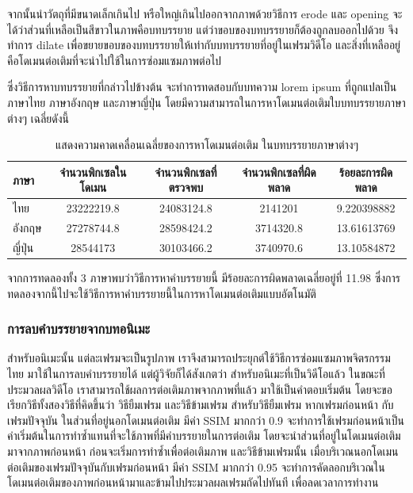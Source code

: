 \documentclass[hidelinks, a4paper,12pt]{article}
\numberwithin{equation}{section}							%
\numberwithin{equation}{section}
\begin{document}
{	\hspace{1cm} จากนั้นนำวัตถุที่มีขนาดเล็กเกินไป หรือใหญ่เกินไปออกจากภาพด้วยวิธีการ erode และ opening
	จะได้ว่าส่วนที่เหลือเป็นสีขาวในภาพคือบทบรรยาย แต่ว่าขอบของบทบรรยายก็ต้องถูกลบออกไปด้วย จึงทำการ dilate เพื่อขยายขอบของบทบรรยายให้เท่ากับบทบรรยายที่อยู่ในเฟรมวิดีโอ และสิ่งที่เหลืออยู่คือโดเมนต่อเติมที่จะนำไปใช้ในการซ่อมแซมภาพต่อไป
	
	\hspace{1cm} ซึ่งวิธีการหาบทบรรยายที่กล่าวไปข้างต้น จะทำการทดสอบกับบทความ lorem ipsum ที่ถูกแปลเป็นภาษาไทย ภาษาอังกฤษ และภาษาญี่ปุ่น โดยมีความสามารถในการหาโดเมนต่อเติมใบบทบรรยายภาษาต่างๆ  เฉลี่ยดังนี้
	
	\begin{table}[H]
		\centering
		\begin{tabular}[ht]{|l|c|c|c|c|}
			\hline
			ภาษา  & จำนวนพิกเซลในโดเมน & จำนวนพิกเซลที่ตรวจพบ & จำนวนพิกเซลที่ผิดพลาด & ร้อยละการผิดพลาด \\
			\hline
			ไทย & 23222219.8 & 24083124.8 & 2141201 & 9.220398882 \\
			อังกฤษ & 27278744.8 & 28598424.2 & 3714320.8 & 13.61613769 \\
			ญี่ปุ่น & 28544173 & 30103466.2 & 3740970.6 & 13.10584872 \\
			\hline
		\end{tabular}
		\caption{แสดงความคาดเคลื่อนเฉลี่ยของการหาโดเมนต่อเติม ในบทบรรยายภาษาต่างๆ}
	\end{table}	
	
	\hspace{1cm} จากการทดลองทั้ง  3 ภาษาพบว่าวิธีการหาคำบรรยายนี้ มีร้อยละการผิดพลาดเฉลี่ยอยู่ที่ 11.98 ซึ่งการทดลองจากนี้ไปจะใช้วิธีการหาคำบรรยายนี้ในการหาโดเมนต่อเติมแบบอัตโนมัติ
	
	\subsubsection{การลบคำบรรยายจากบทอนิเมะ}
	\hspace{1cm} สำหรับอนิเมะนั้น แต่ละเฟรมจะเป็นรูปภาพ เราจึงสามารถประยุกต์ใช้วิธีการซ่อมแซมภาพจิตรกรรมไทย มาใช้ในการลบคำบรรยายได้ แต่ผู้วิจัยก็ได้สังเกตว่า สำหรับอนิเมะที่เป็นวิดีโอแล้ว ในขณะที่ประมวลผลวิดีโอ เราสามารถใช้ผลการต่อเติมภาพจากภาพที่แล้ว มาใช้เป็นคำตอบเริ่มต้น โดยจะขอเรียกวิธีทั้งสองวิธีที่คิดขึ้นว่า วิธียืมเฟรม และวิธีข้ามเฟรม สำหรับวิธียืมเฟรม หากเฟรมก่อนหน้า กับเฟรมปัจจุบัน ในส่วนที่อยู่นอกโดเมนต่อเติม มีค่า SSIM มากกว่า 0.9 จะทำการใช้เฟรมก่อนหน้าเป็นค่าเริ่มต้นในการทำซ้ำแทนที่จะใช้ภาพที่มีคำบรรยายในการต่อเติม โดยจะนำส่วนที่อยู่ในโดเมนต่อเติมมาจากภาพก่อนหน้า ก่อนจะเริ่มการทำซ้ำเพื่อต่อเติมภาพ และวิธีข้ามเฟรมนั้น เมื่อบริเวณนอกโดเมนต่อเติมของเฟรมปัจจุบันกับเฟรมก่อนหน้า มีค่า SSIM มากกว่า 0.95 จะทำการคัดลอกบริเวณในโดเมนต่อเติมของภาพก่อนหน้ามาและข้ามไปประมวลผลเฟรมถัดไปทันที เพื่อลดเวลาการทำงาน 
	
}
\end{document}
